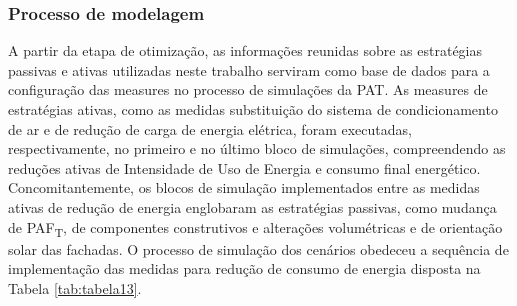 \subsubsection{Processo de modelagem}
\noindent A partir da etapa de otimização, as informações reunidas sobre as estratégias passivas e ativas utilizadas neste trabalho serviram como base de dados para a configuração das measures no processo de simulações da PAT. As measures de estratégias ativas, como as medidas substituição do sistema de condicionamento de ar e de redução de carga de energia elétrica, foram executadas, respectivamente, no primeiro e no último bloco de simulações, compreendendo as reduções ativas de Intensidade de Uso de Energia e consumo final energético.\vspace*{0.3cm} \newline
\noindent Concomitantemente, os blocos de simulação implementados entre as medidas ativas de redução de energia englobaram as estratégias passivas, como mudança de PAF\textsubscript{T}, de componentes construtivos e alterações volumétricas e de orientação solar das fachadas. O processo de simulação dos cenários obedeceu a sequência de implementação das medidas para redução de consumo de energia disposta na Tabela \ref{tab:tabela13}.\vspace*{-0.1cm}
